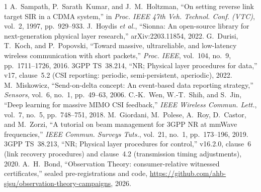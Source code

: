 \documentclass[conference]{IEEEtran}
\begin{document}
\begin{thebibliography}{1}
 A.~Sampath, P.~Sarath~Kumar, and J.~M.~Holtzman, ``On setting reverse link
target SIR in a CDMA system,'' in \emph{Proc. IEEE 47th Veh. Technol. Conf. (VTC)},
vol.~2, 1997, pp.~929--933.
 J.~Hoydis \emph{et al.}, ``Sionna: An open-source library for
next-generation physical layer research,'' arXiv:2203.11854, 2022.
 G.~Durisi, T.~Koch, and P.~Popovski, ``Toward massive, ultrareliable, and
low-latency wireless communication with short packets,'' \emph{Proc. IEEE}, vol.~104,
no.~9, pp.~1711--1726, 2016.
 3GPP TS~38.214, ``NR; Physical layer procedures for data,'' v17,
clause~5.2 (CSI reporting: periodic, semi-persistent, aperiodic), 2022.
 M.~Miskowicz, ``Send-on-delta concept: An event-based data reporting
strategy,'' \emph{Sensors}, vol.~6, no.~1, pp.~49--63, 2006.
 C.-K.~Wen, W.-T.~Shih, and S.~Jin, ``Deep learning for massive MIMO CSI
feedback,'' \emph{IEEE Wireless Commun. Lett.}, vol.~7, no.~5, pp.~748--751, 2018.
 M.~Giordani, M.~Polese, A.~Roy, D.~Castor, and M.~Zorzi, ``A tutorial
on beam management for 3GPP NR at mmWave frequencies,'' \emph{IEEE Commun. Surveys
Tuts.}, vol.~21, no.~1, pp.~173--196, 2019.
 3GPP TS~38.213, ``NR; Physical layer procedures for control,''
v16.2.0, clause~6 (link recovery procedures) and clause~4.2 (transmission timing
adjustments), 2020.
 A.~H.~Bond, ``Observation Theory: consumer-relative witnessed
certificates,'' sealed pre-registrations and code,
\url{https://github.com/ahb-sjsu/observation-theory-campaigns}, 2026.
\end{thebibliography}
\end{document}
